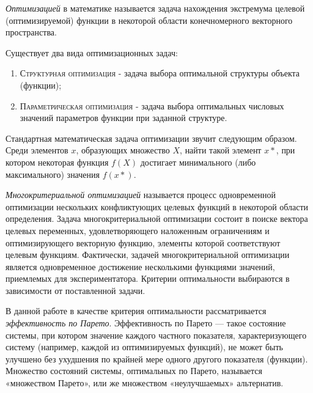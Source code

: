 \startprefacepage

\textit{Оптимизацией} в математике называется задача нахождения экстремума целевой (оптимизируемой) 
функции в некоторой области конечномерного векторного пространства.

Существует два вида оптимизационных задач:~\cite{wiki_opt}
\begin{enumerate}
\item \textsc{Структурная оптимизация} - задача выбора оптимальной структуры объекта (функции);
\item \textsc{Параметрическая оптимизация} - задача выбора оптимальных числовых значений параметров 
	функции при заданной структуре.
\end{enumerate}

Стандартная математическая задача оптимизации звучит следующим образом. Среди элементов $x$, 
образующих множество $X$, найти такой элемент $x*$, при котором некоторая функция $f(X)$ достигает 
минимального (либо максимального) значения $f(x*)$.

\textit{Многокритериальной оптимизацией} называется процесс одновременной оптимизации нескольких 
конфликтующих целевых функций в некоторой области определения. Задача многокритериальной оптимизации 
состоит в поиске вектора целевых переменных, удовлетворяющего наложенным ограничениям и оптимизирующего 
векторную функцию, элементы которой соответствуют целевым функциям. \cite{wiki_multiopt}
Фактически, задачей многокритериальной оптимизации является одновременное достижение несколькими 
функциями значений, приемлемых для экспериментатора. Критерии оптимальности выбираются в зависимости 
от поставленной задачи.

В данной работе в качестве критерия оптимальности рассматривается \textit{эффективность по Парето}. 
Эффективность по Парето — такое состояние системы, при котором значение каждого частного 
показателя, характеризующего систему (например, каждой из оптимизируемых функций), не может 
быть улучшено без ухудшения по крайней мере одного другого показателя (функции). Множество состояний 
системы, оптимальных по Парето, называется «множеством Парето», или же множеством «неулучшаемых» 
альтернатив.~\cite{wiki_pareto}

